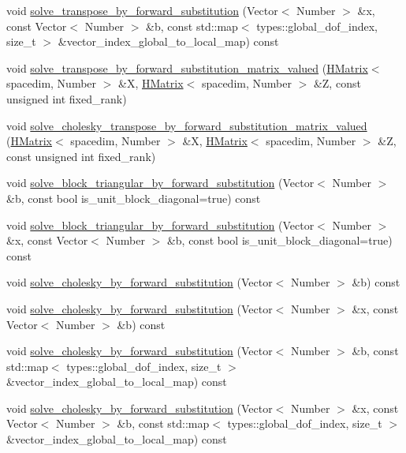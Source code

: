 \begin{DoxyCompactItemize}
void \hyperlink{classHMatrix_a8e9c993ce276353fda2bfefd0b932670}{solve\+\_\+transpose\+\_\+by\+\_\+forward\+\_\+substitution} (Vector$<$ Number $>$ \&x, const Vector$<$ Number $>$ \&b, const std\+::map$<$ types\+::global\+\_\+dof\+\_\+index, size\+\_\+t $>$ \&vector\+\_\+index\+\_\+global\+\_\+to\+\_\+local\+\_\+map) const
\item 
void \hyperlink{classHMatrix_a469507ef4061efcc29a65c413ac7acea}{solve\+\_\+transpose\+\_\+by\+\_\+forward\+\_\+substitution\+\_\+matrix\+\_\+valued} (\hyperlink{classHMatrix}{H\+Matrix}$<$ spacedim, Number $>$ \&X, \hyperlink{classHMatrix}{H\+Matrix}$<$ spacedim, Number $>$ \&Z, const unsigned int fixed\+\_\+rank)
\item 
void \hyperlink{classHMatrix_a41f0e0b791e50a3d9b5c0e73ee4423c6}{solve\+\_\+cholesky\+\_\+transpose\+\_\+by\+\_\+forward\+\_\+substitution\+\_\+matrix\+\_\+valued} (\hyperlink{classHMatrix}{H\+Matrix}$<$ spacedim, Number $>$ \&X, \hyperlink{classHMatrix}{H\+Matrix}$<$ spacedim, Number $>$ \&Z, const unsigned int fixed\+\_\+rank)
\item 
void \hyperlink{classHMatrix_ab8b64d4a5b7120a2599ec3e3e0708775}{solve\+\_\+block\+\_\+triangular\+\_\+by\+\_\+forward\+\_\+substitution} (Vector$<$ Number $>$ \&b, const bool is\+\_\+unit\+\_\+block\+\_\+diagonal=true) const
\item 
void \hyperlink{classHMatrix_aa8046a87be454c81d4a884b53150685a}{solve\+\_\+block\+\_\+triangular\+\_\+by\+\_\+forward\+\_\+substitution} (Vector$<$ Number $>$ \&x, const Vector$<$ Number $>$ \&b, const bool is\+\_\+unit\+\_\+block\+\_\+diagonal=true) const
\item 
void \hyperlink{classHMatrix_a09beb710b79d47e34ff3283424cf2a22}{solve\+\_\+cholesky\+\_\+by\+\_\+forward\+\_\+substitution} (Vector$<$ Number $>$ \&b) const
\item 
void \hyperlink{classHMatrix_a59d32edbfaac9221dc5e219640c3ecd3}{solve\+\_\+cholesky\+\_\+by\+\_\+forward\+\_\+substitution} (Vector$<$ Number $>$ \&x, const Vector$<$ Number $>$ \&b) const
\item 
void \hyperlink{classHMatrix_a987af3012854b397b90f19f742085155}{solve\+\_\+cholesky\+\_\+by\+\_\+forward\+\_\+substitution} (Vector$<$ Number $>$ \&b, const std\+::map$<$ types\+::global\+\_\+dof\+\_\+index, size\+\_\+t $>$ \&vector\+\_\+index\+\_\+global\+\_\+to\+\_\+local\+\_\+map) const
\item 
void \hyperlink{classHMatrix_a0b81214fb9287b344dff8349c7122583}{solve\+\_\+cholesky\+\_\+by\+\_\+forward\+\_\+substitution} (Vector$<$ Number $>$ \&x, const Vector$<$ Number $>$ \&b, const std\+::map$<$ types\+::global\+\_\+dof\+\_\+index, size\+\_\+t $>$ \&vector\+\_\+index\+\_\+global\+\_\+to\+\_\+local\+\_\+map) const

\end{DoxyCompactItemize}
